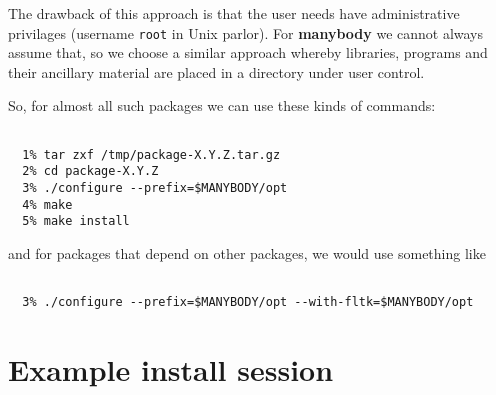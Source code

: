 {The drawback of this approach is that the user needs have administrative
privilages (username {\tt root} in Unix parlor). For {\bf manybody} we
cannot always assume that, so we choose a similar approach whereby libraries, programs
and their ancillary material are placed in a directory under user control.


So, for almost all such packages we can use these kinds of commands:

\footnotesize\begin{verbatim}

  1% tar zxf /tmp/package-X.Y.Z.tar.gz
  2% cd package-X.Y.Z
  3% ./configure --prefix=$MANYBODY/opt
  4% make
  5% make install

\end{verbatim}\normalsize

and for packages that depend on other packages, we would use something like

\footnotesize\begin{verbatim}

  3% ./configure --prefix=$MANYBODY/opt --with-fltk=$MANYBODY/opt

\end{verbatim}\normalsize


\section{Example install session}

}
